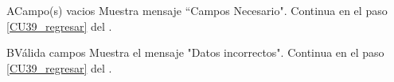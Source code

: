 \begin{UCtrayectoriaA}{A}{Campo(s) vacios}
\UCpaso Muestra mensaje “Campos Necesario".
\UCpaso Continua en el paso \ref{CU39_regresar} del .
\end{UCtrayectoriaA}

\begin{UCtrayectoriaA}{B}{Válida campos}
\UCpaso Muestra el mensaje "Datos incorrectos".
\UCpaso Continua en el paso \ref{CU39_regresar} del .
\end{UCtrayectoriaA}
